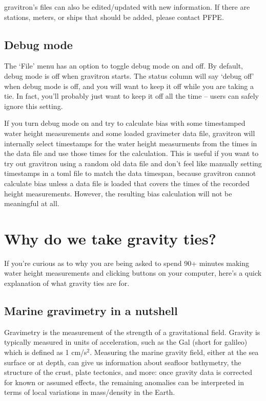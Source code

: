 \documentclass{pfpe-manual}
\begin{document}
gravitron's files can also be edited/updated with new information. If there are stations, meters, or ships that should be added, please contact PFPE.

\subsection{Debug mode}
\label{nobugs}
The `File' menu has an option to toggle debug mode on and off. By default, debug mode is off when gravitron starts. The status column will say `debug off' when debug mode is off, and you will want to keep it off while you are taking a tie. In fact, you'll probably just want to keep it off all the time -- users can safely ignore this setting.

If you turn debug mode on and try to calculate bias with some timestamped water height measurements and some loaded gravimeter data file, gravitron will internally select timestamps for the water height measurments from the times in the data file and use those times for the calculation. This is useful if you want to try out gravitron using a random old data file and don't feel like manually setting timestamps in a toml file to match the data timespan, because gravitron cannot calculate bias unless a data file is loaded that covers the times of the recorded height measurements. However, the resulting bias calculation will not be meaningful at all. 


\section{Why do we take gravity ties?}
If you're curious as to why you are being asked to spend 90+ minutes making water height measurements and clicking buttons on your computer, here's a quick explanation of what gravity ties are for.

\subsection{Marine gravimetry in a nutshell}
Gravimetry is the measurement of the strength of a gravitational field. Gravity is typically measured in units of acceleration, such as the Gal (short for galileo) which is defined as 1 cm/s$^2$. Measuring the marine gravity field, either at the sea surface or at depth, can give us information about seafloor bathymetry, the structure of the crust, plate tectonics, and more: once gravity data is corrected for known or assumed effects, the remaining anomalies can be interpreted in terms of local variations in mass/density in the Earth.
\end{document}
